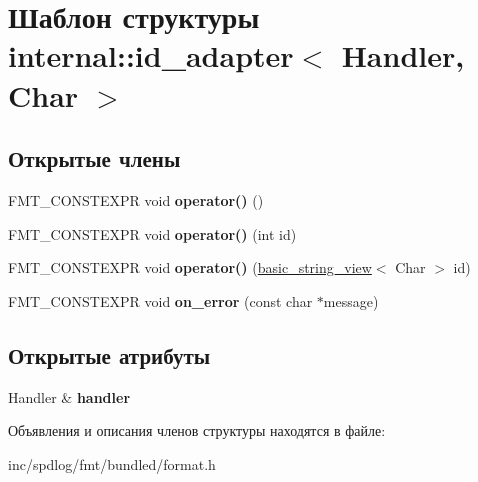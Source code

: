 \hypertarget{structinternal_1_1id__adapter}{}\section{Шаблон структуры internal\+:\+:id\+\_\+adapter$<$ Handler, Char $>$}
\label{structinternal_1_1id__adapter}
\subsection*{Открытые члены}
\begin{DoxyCompactItemize}
\item 
\mbox{\label{structinternal_1_1id__adapter_a28539391bce96a9118b6e21f2fccb888}} 
F\+M\+T\+\_\+\+C\+O\+N\+S\+T\+E\+X\+PR void {\bfseries operator()} ()
\item 
\mbox{\label{structinternal_1_1id__adapter_a8431ffe12a0c8adeda428230a2624b58}} 
F\+M\+T\+\_\+\+C\+O\+N\+S\+T\+E\+X\+PR void {\bfseries operator()} (int id)
\item 
\mbox{\label{structinternal_1_1id__adapter_a9e046831c2198e748c7d9cf56991ef2d}} 
F\+M\+T\+\_\+\+C\+O\+N\+S\+T\+E\+X\+PR void {\bfseries operator()} (\hyperlink{classbasic__string__view}{basic\+\_\+string\+\_\+view}$<$ Char $>$ id)
\item 
\mbox{\label{structinternal_1_1id__adapter_a2e03feac07a2d549161205d50b96fe45}} 
F\+M\+T\+\_\+\+C\+O\+N\+S\+T\+E\+X\+PR void {\bfseries on\+\_\+error} (const char $\ast$message)
\end{DoxyCompactItemize}
\subsection*{Открытые атрибуты}
\begin{DoxyCompactItemize}
\item 
\mbox{\label{structinternal_1_1id__adapter_a0db6b62cfd71e15f58fc5006d5cbd54e}} 
Handler \& {\bfseries handler}
\end{DoxyCompactItemize}


Объявления и описания членов структуры находятся в файле\+:\begin{DoxyCompactItemize}
\item 
inc/spdlog/fmt/bundled/format.\+h\end{DoxyCompactItemize}
